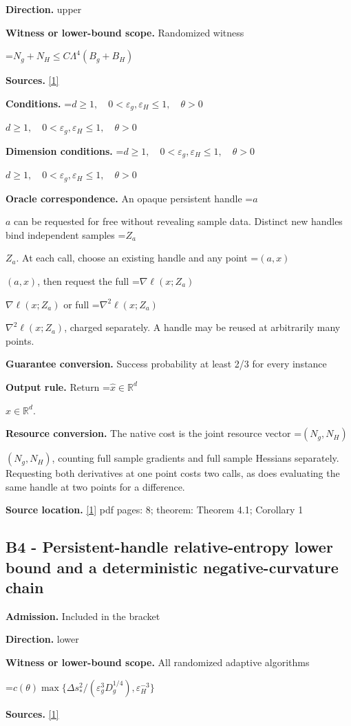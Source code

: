 \documentclass[10pt,a4paper]{article}
\newcommand{\AtlasMath}[1]{\par\begingroup\centering\setbox0=\hbox{$\displaystyle #1$}\ifdim\wd0>1.4\linewidth\typeout{ATLAS WIDE FORMULA: \the\wd0}\fi\ifdim\wd0>\linewidth\resizebox{\linewidth}{!}{\box0}\else\box0\fi\par\endgroup}
\newcommand{\AtlasInlineMath}[1]{\begingroup\setbox0=\hbox{$#1$}\ifdim\wd0>.4\linewidth\endgroup\AtlasMath{#1}\else\endgroup$#1$\fi}
\begin{document}
\textbf{Direction.} upper

\textbf{Witness or lower-bound scope.} Randomized witness

\AtlasMath{N_g+N_H\le C\Lambda^4(B_g+B_H)}
\textbf{Sources.} \href{https://arxiv.org/pdf/2610.16832v2}{[1]}

\textbf{Conditions.} \AtlasInlineMath{d\ge1,\quad0<\varepsilon_g,\varepsilon_H\le1,\quad\theta>0}

\textbf{Dimension conditions.} \AtlasInlineMath{d\ge1,\quad0<\varepsilon_g,\varepsilon_H\le1,\quad\theta>0}

\textbf{Oracle correspondence.} An opaque persistent handle \AtlasInlineMath{a} can be requested for free without revealing sample data. Distinct new handles bind independent samples \AtlasInlineMath{Z_a}. At each call, choose an existing handle and any point \AtlasInlineMath{(a,x)}, then request the full \AtlasInlineMath{\nabla\ell(x;Z_a)} or full \AtlasInlineMath{\nabla^2\ell(x;Z_a)}, charged separately. A handle may be reused at arbitrarily many points.

\textbf{Guarantee conversion.} Success probability at least 2/3 for every instance

\textbf{Output rule.} Return \AtlasInlineMath{\widehat{x}\in \mathbb{R}^d}.

\textbf{Resource conversion.} The native cost is the joint resource vector \AtlasInlineMath{(N_g,N_H)}, counting full sample gradients and full sample Hessians separately. Requesting both derivatives at one point costs two calls, as does evaluating the same handle at two points for a difference.

\textbf{Source location.} \href{https://arxiv.org/pdf/2610.16832v2}{[1]} pdf pages: 8; theorem: Theorem 4.1; Corollary 1

\subsection{B4 - Persistent-handle relative-entropy lower bound and a deterministic negative-curvature chain}
\textbf{Admission.} Included in the bracket

\textbf{Direction.} lower

\textbf{Witness or lower-bound scope.} All randomized adaptive algorithms

\AtlasMath{c(\theta)\max\{\Delta s_*^2/(\varepsilon_g^3D_g^{1/4}),\varepsilon_H^{-3}\}}
\textbf{Sources.} \href{https://arxiv.org/pdf/2610.16832v2}{[1]}
\end{document}

